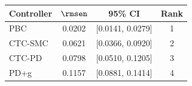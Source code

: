 \begin{tabular}{lccc}
\toprule
Controller & $\rmsen$ & 95\% CI & Rank \\
\midrule
PBC     & 0.0202 & [0.0141, 0.0279] & 1 \\
CTC-SMC & 0.0621 & [0.0366, 0.0920] & 2 \\
CTC-PD  & 0.0798 & [0.0510, 0.1205] & 3 \\
PD+g    & 0.1157 & [0.0881, 0.1414] & 4 \\
\bottomrule
\end{tabular}
